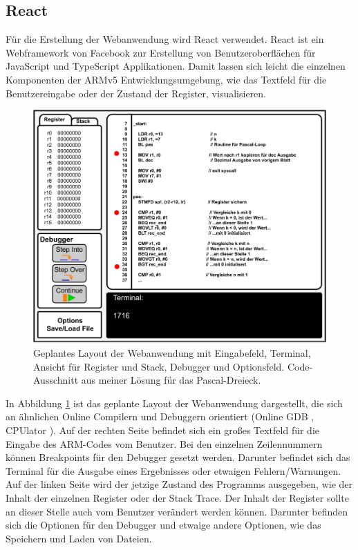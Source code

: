 \documentclass[a4paper, 11pt, onecolumn]{article}
\begin{document}
\subsection{React}

Für die Erstellung der Webanwendung wird React verwendet. React \cite{react} ist ein Webframework von Facebook zur Erstellung von Benutzeroberflächen für JavaScript und TypeScript Applikationen. Damit lassen sich leicht die einzelnen Komponenten der ARMv5 Entwicklungsumgebung, wie das Textfeld für die Benutzereingabe oder der Zustand der Register, visualisieren.

\begin{figure}[!htb]	
	\includegraphics[width=0.8\paperwidth]{data/layout}
	\caption{Geplantes Layout der Webanwendung mit Eingabefeld, Terminal, Ansicht für Register und Stack, Debugger und Optionsfeld. Code-Ausschnitt aus meiner Lösung für das Pascal-Dreieck.}
	\label{layout}
\end{figure}

In Abbildung \ref{layout} ist das geplante Layout der Webanwendung dargestellt, die sich an ähnlichen Online Compilern und Debuggern orientiert (Online GDB \cite{onlinegdb}, CPUlator \cite{cpulator}). Auf der rechten Seite befindet sich ein großes Textfeld für die Eingabe des ARM-Codes vom Benutzer. Bei den einzelnen Zeilennummern können Breakpoints für den Debugger gesetzt werden. Darunter befindet sich das Terminal für die Ausgabe eines Ergebnisses oder etwaigen Fehlern/Warnungen. Auf der linken Seite wird der jetzige Zustand des Programms ausgegeben, wie der Inhalt der einzelnen Register oder der Stack Trace. Der Inhalt der Register sollte an dieser Stelle auch vom Benutzer verändert werden können. Darunter befinden sich die Optionen für den Debugger und etwaige andere Optionen, wie das Speichern und Laden von Dateien.
\end{document}
